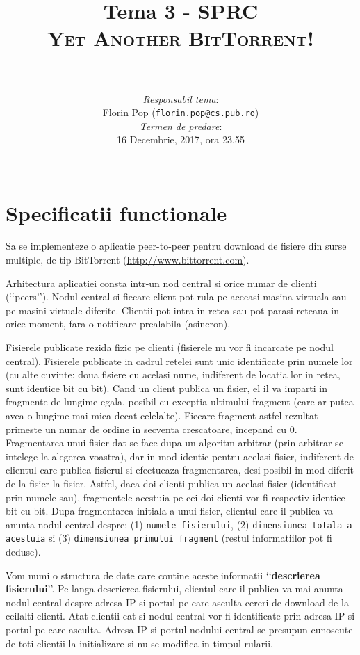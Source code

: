 \documentclass[a4paper]{article}
\author{
\noindent\rule{10cm}{0.4pt}\vspace{0.1in}\\
\textit{Responsabil tema}:\\Florin Pop (\texttt{florin.pop@cs.pub.ro})
\vspace{0.15in}
\\\textit{Termen de predare}:\\16 Decembrie, 2017, ora 23.55
\vspace{0.15in}\\\noindent\rule{10cm}{0.4pt}
}
\title{Tema 3 - SPRC\\\textsc{Yet Another BitTorrent!}}
\date{}
\begin{document}
\maketitle

\section{Specificatii functionale}
\label{sec1}

\par Sa se implementeze o aplicatie peer-to-peer pentru download de fisiere din surse multiple, de tip BitTorrent (\url{http://www.bittorrent.com}).

\par Arhitectura aplicatiei consta intr-un nod central si orice numar de clienti (\lq\lq{}peers\rq\rq{}). Nodul central si fiecare client pot rula pe aceeasi masina virtuala sau pe masini virtuale diferite. Clientii pot intra in retea sau pot parasi reteaua in orice moment, fara o notificare prealabila (asincron).

\par Fisierele publicate rezida fizic pe clienti (fisierele nu vor fi incarcate pe nodul central). Fisierele publicate in cadrul retelei sunt unic identificate prin numele lor (cu alte cuvinte: doua fisiere cu acelasi nume, indiferent de locatia lor in retea, sunt identice bit cu bit). Cand un client publica un fisier, el il va imparti in fragmente de lungime egala, posibil cu exceptia ultimului fragment (care ar putea avea o lungime mai mica decat celelalte). Fiecare fragment astfel rezultat primeste un numar de ordine in secventa crescatoare, incepand cu 0. Fragmentarea unui fisier dat se face dupa un algoritm arbitrar (prin arbitrar se intelege la alegerea voastra), dar in mod identic pentru acelasi fisier, indiferent de clientul care publica fisierul si efectueaza fragmentarea, desi posibil in mod diferit de la fisier la fisier. Astfel, daca doi clienti publica un acelasi fisier (identificat prin numele sau), fragmentele acestuia pe cei doi clienti vor fi respectiv identice bit cu bit. Dupa fragmentarea initiala a unui fisier, clientul care il publica va anunta nodul central despre: (1) \texttt{numele fisierului}, (2) \texttt{dimensiunea totala a acestuia} si (3) \texttt{dimensiunea primului fragment} (restul informatiilor pot fi deduse).

\par Vom numi o structura de date care contine aceste informatii \lq\lq{}\textbf{descrierea fisierului}\rq\rq{}. Pe langa descrierea fisierului, clientul care il publica va mai anunta nodul central despre adresa IP si portul pe care asculta cereri de download de la ceilalti clienti. Atat clientii cat si nodul central vor fi identificate prin adresa IP si portul pe care asculta. Adresa IP si portul nodului central se presupun cunoscute de toti clientii la initializare si nu se modifica in timpul rularii.
\end{document}
